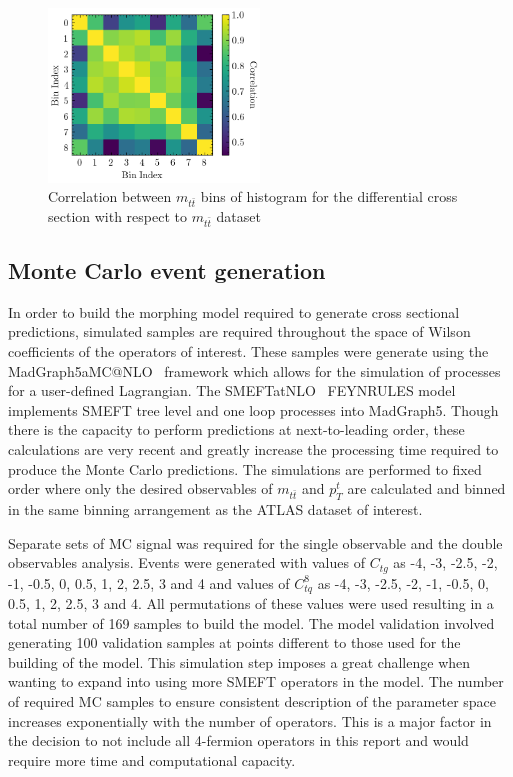 \documentclass[a4paper,11pt]{article}
\begin{document}
\begin{figure}[htb]
    \centering
    \includegraphics[width=0.5\textwidth]{plots/correlation.png}
    \caption{Correlation between $m_{t\bar{t}}$ bins of histogram for the differential cross section with respect to $m_{t\bar{t}}$ dataset}
    \label{fig:correlation}
\end{figure}





\subsection{Monte Carlo event generation}
In order to build the morphing model required to generate cross sectional predictions, simulated samples are required throughout the space of Wilson coefficients of the operators of interest.
These samples were generate using the MadGraph5\textunderscore aMC@NLO~\cite{Alwall_2014} framework which allows for the simulation of processes for a user-defined Lagrangian.
The SMEFTatNLO~\cite{degrande2020automated} FEYNRULES model implements SMEFT tree level and one loop processes into MadGraph5.
Though there is the capacity to perform predictions at next-to-leading order, these calculations are very recent  and greatly increase the processing time required to produce the Monte Carlo predictions.
The simulations are performed to fixed order where only the desired observables of $m_{t\bar{t}}$ and ${p_{T}^{t}}$ are calculated and binned in the same binning arrangement as the ATLAS dataset of interest.

Separate sets of MC signal was required for the single observable and the double observables analysis.
Events were generated with values of $C_{tg}$ as -4, -3, -2.5, -2, -1, -0.5, 0, 0.5, 1, 2, 2.5, 3 and 4 and values of $C_{tq}^{8}$ as -4, -3, -2.5, -2, -1, -0.5, 0, 0.5, 1, 2, 2.5, 3 and 4. 
All permutations of these values were used resulting in a total number of 169 samples to build the model.
The model validation involved generating 100 validation samples at points different to those used for the building of the model.
This simulation step imposes a great challenge when wanting to expand into using more SMEFT operators in the model.
The number of required MC samples to ensure consistent description of the parameter space increases exponentially with the number of operators.
This is a major factor in the decision to not include all 4-fermion operators in this report and would require more time and computational capacity.
\end{document}

